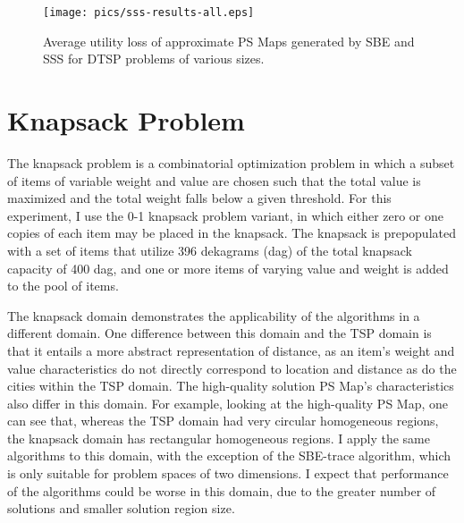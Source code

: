 \begin{figure}
\begin{center}
\texttt{[image: pics/sss-results-all.eps]}
\caption{Average utility loss of approximate PS Maps generated by SBE and SSS for DTSP problems of various sizes.}
\label{fig:sss-results-all}
\end{center}
\end{figure}













\section{Knapsack Problem}

The knapsack problem is a combinatorial optimization problem in which a subset of items of variable weight and value are chosen such that the total value is maximized and the total weight falls below  a given threshold.  For this experiment, I use the 0-1 knapsack problem variant, in which either zero or one copies of each item may be placed in the knapsack.  The knapsack is prepopulated with a set of items that utilize 396 dekagrams (dag) of the total knapsack capacity of 400 dag, and one or more items  of varying value and weight is added to the pool of items.

The knapsack domain demonstrates the applicability of the algorithms in a different domain.  One difference between this domain and the TSP domain is that it entails a more abstract representation of distance, as an item's  weight and value characteristics do not directly correspond to location and  distance as do the cities within the TSP domain. The high-quality solution PS Map's characteristics also differ in this domain.  For example, looking at the high-quality PS Map, one can see that, whereas the TSP domain had very circular homogeneous regions, the knapsack domain has rectangular homogeneous regions.  I apply the same algorithms to this domain, with the exception of the SBE-trace algorithm, which is only suitable for problem spaces of two dimensions.  I expect that performance of the algorithms could be worse in this domain, due to the greater number of solutions and smaller solution region size.



